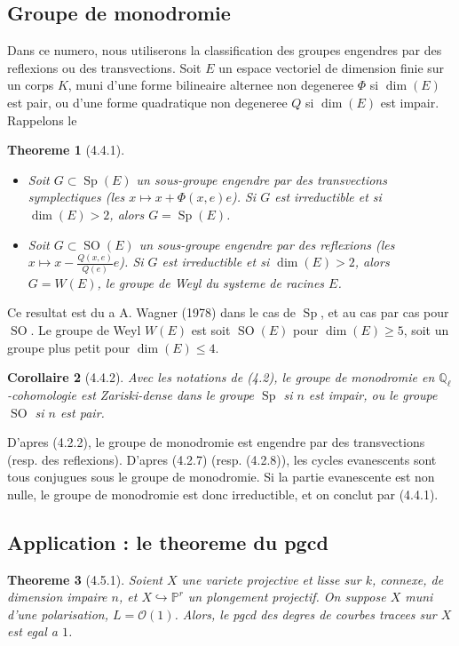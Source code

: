 \documentclass[12pt,a4paper]{article}
\theoremstyle{plain}
\newtheorem{theorem}{Theoreme}[section]
\newtheorem{corollary}[theorem]{Corollaire}
\theoremstyle{definition}
\theoremstyle{remark}
\DeclareMathOperator{\Sp}{Sp}
\DeclareMathOperator{\SO}{SO}
\newcommand{\bbP}{\mathbb{P}}
\newcommand{\scrO}{\mathscr{O}}
\newcommand{\Ql}{\mathbb{Q}_\ell}
\begin{document}
\subsection{Groupe de monodromie}

Dans ce numero, nous utiliserons la classification des groupes engendres par des reflexions ou des transvections. Soit $E$ un espace vectoriel de dimension finie sur un corps $K$, muni d'une forme bilineaire alternee non degeneree $\Phi$ si $\dim(E)$ est pair, ou d'une forme quadratique non degeneree $Q$ si $\dim(E)$ est impair. Rappelons le

\begin{theorem}[4.4.1]
\ \begin{itemize}
\item[(i)] Soit $G \subset \Sp(E)$ un sous-groupe engendre par des transvections symplectiques (les $x \mapsto x + \Phi(x, e)e$). Si $G$ est irreductible et si $\dim(E) > 2$, alors $G = \Sp(E)$.
\item[(ii)] Soit $G \subset \SO(E)$ un sous-groupe engendre par des reflexions (les $x \mapsto x - \frac{Q(x,e)}{Q(e)}e$). Si $G$ est irreductible et si $\dim(E) > 2$, alors $G = W(E)$, le groupe de Weyl du systeme de racines $E$.
\end{itemize}
\end{theorem}

Ce resultat est du a A. Wagner (1978) dans le cas de $\Sp$, et au cas par cas pour $\SO$. Le groupe de Weyl $W(E)$ est soit $\SO(E)$ pour $\dim(E) \geq 5$, soit un groupe plus petit pour $\dim(E) \leq 4$.

\begin{corollary}[4.4.2]
Avec les notations de (4.2), le groupe de monodromie en $\Ql$-cohomologie est Zariski-dense dans le groupe $\Sp$ si $n$ est impair, ou le groupe $\SO$ si $n$ est pair.
\end{corollary}

D'apres (4.2.2), le groupe de monodromie est engendre par des transvections (resp. des reflexions). D'apres (4.2.7) (resp. (4.2.8)), les cycles evanescents sont tous conjugues sous le groupe de monodromie. Si la partie evanescente est non nulle, le groupe de monodromie est donc irreductible, et on conclut par (4.4.1).

\subsection{Application : le theoreme du pgcd}

\begin{theorem}[4.5.1]
Soient $X$ une variete projective et lisse sur $k$, connexe, de dimension impaire $n$, et $X \hookrightarrow \bbP^r$ un plongement projectif. On suppose $X$ muni d'une polarisation, $L = \scrO(1)$. Alors, le pgcd des degres de courbes tracees sur $X$ est egal a $1$.
\end{theorem}
\end{document}
